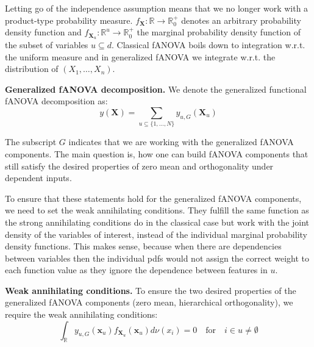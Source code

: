 Letting go of the independence assumption means that we no longer work with a product-type probability measure. $f_{\boldsymbol{X}}: \mathbb{R} \rightarrow \mathbb{R}_{0}^{+}$ denotes an arbitrary probability density function and $f_{\boldsymbol{X}_u}: \mathbb{R}^u \rightarrow \mathbb{R}_{0}^{+}$ the marginal probability density function of the subset of variables $u \subseteq d$. Classical fANOVA boils down to integration w.r.t. the uniform measure and in generalized fANOVA we integrate w.r.t. the distribution of $(X_1, \dots, X_n)$.\par

\begin{definition}
    \textbf{Generalized fANOVA decomposition.}
    We denote the generalized functional fANOVA decomposition as:
    \begin{equation}
        y(\boldsymbol{X}) = \sum_{u \subseteq \{1, \dots, N\}} y_{u, G}(\boldsymbol{X}_u)
    \end{equation}
\end{definition}
The subscript $G$ indicates that we are working with the generalized fANOVA components.
The main question is, how one can build fANOVA components that still satisfy the desired properties of zero mean and orthogonality under dependent inputs.

To ensure that these statements hold for the generalized fANOVA components, we need to set the weak annihilating conditions.
They fulfill the same function as the strong annihilating conditions do in the classical case but work with the joint density of the variables of interest, instead of the individual marginal probability density functions.
{\color{red}This makes sense, because when there are dependencies between variables then the individual pdfs would not assign the correct weight to each function value as they ignore the dependence between features in $u$.}
\begin{proposition}
    \textbf{Weak annihilating conditions.}
    To ensure the two desired properties of the generalized fANOVA components (zero mean, hierarchical orthogonality), we require the weak annihilating conditions:
\begin{equation}
    \int_{\mathbb{R}} y_{u, G}(\boldsymbol{x}_u) f_{\boldsymbol{X}_u}(\boldsymbol{x}_u) d\nu (x_i) = 0 \quad \text{for} \quad i \in u \neq \emptyset
\end{equation}
\end{proposition}

